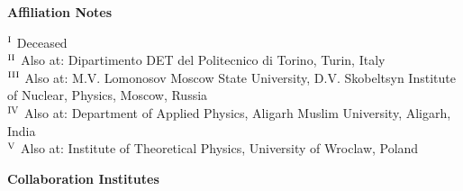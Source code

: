 \begin{flushleft}
\bigskip 



\bigskip 

\textbf{\Large Affiliation Notes} 



\bigskip 

$^{\rm I}$ Deceased\\
$^{\rm II}$ Also at: Dipartimento DET del Politecnico di Torino, Turin, Italy\\
$^{\rm III}$ Also at: M.V. Lomonosov Moscow State University, D.V. Skobeltsyn Institute of Nuclear, Physics, Moscow, Russia\\
$^{\rm IV}$ Also at: Department of Applied Physics, Aligarh Muslim University, Aligarh, India\\
$^{\rm V}$ Also at: Institute of Theoretical Physics, University of Wroclaw, Poland\\


\bigskip 



\bigskip 

\textbf{\Large Collaboration Institutes} 



\bigskip 


\end{flushleft}
